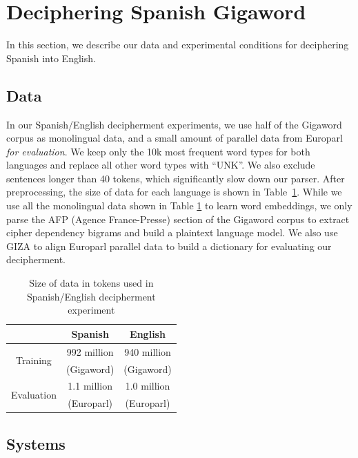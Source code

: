 \section{Deciphering Spanish Gigaword}
\label{decipher_spanish}

In this section, we describe our data and experimental conditions for deciphering Spanish into English.

\subsection{Data}

In our Spanish/English decipherment experiments, we use half of the Gigaword corpus as monolingual data, and a small amount of parallel data from Europarl {\em for evaluation}. We keep only the 10k most frequent word types for both languages and replace all other word types with ``UNK''.  We also exclude sentences longer than 40 tokens, which significantly slow down our parser. After preprocessing, the size of data for each language is shown in Table~\ref{es-en-data}. 
While we use all the monolingual data shown in Table \ref{es-en-data} to learn word embeddings, we only parse the AFP (Agence France-Presse) section of the Gigaword corpus to extract cipher dependency bigrams and build a plaintext language model. We also use GIZA \cite{GIZA} to align Europarl parallel data to build a dictionary for evaluating our decipherment.

 \begin{table}
 \begin{center}
 \begin{tabular}{ |c|c|c| } \hline
             & Spanish & English \\ \hline
\multirow{2}{*}{Training} & 992 million & 940 million \\ 
 & (Gigaword) & (Gigaword)  \\ \hline
\multirow{2}{*}{Evaluation} & 1.1 million & 1.0 million \\
 & (Europarl) & (Europarl) \\ \hline
 \end{tabular}
 \caption{Size of data in tokens used in Spanish/English decipherment experiment}
 \label{es-en-data}
 \end{center}
 \end{table}

\subsection{Systems}

